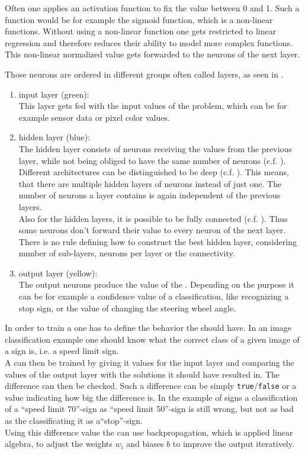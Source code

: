 Often one applies an activation function to fix the value between 0 and 1. Such a function would be for example the sigmoid function, which is a non-linear functions. Without using a non-linear function one gets restricted to linear regression and therefore reduces their ability to model more complex functions.
This non-linear normalized value gets forwarded to the neurons of the next layer.

Those neurons are ordered in different groups often called layers, as seen in .
\begin{enumerate}
	\item input layer (green):\\ \label{item input layer}
	This layer gets fed with the input values of the problem, which can be for example sensor data or pixel color values.
	\item hidden layer (blue):\\\label{item hidden layer}
	The hidden layer consists of neurons receiving the values from the previous layer, while not being obliged to have the same number of neurons (c.f. ).
	Different architectures can be distinguished to be deep (c.f. ). This means, that there are multiple hidden layers of neurons instead of just one. The number of neurons a layer contains is again independent of the previous layers.\\
	Also for the hidden layers, it is possible to be fully connected (c.f. ). Thus some neurons don't forward their value to every neuron of the next layer.\\
	There is no rule defining how to construct the best hidden layer, considering number of sub-layers, neurons per layer or the connectivity.
	\item output layer (yellow):\\ \label{item output layer}
	The output neurons produce the value of the \nn. Depending on the \nns purpose it can be for example a confidence value of a classification, like recognizing a stop sign, or the value of changing the steering wheel angle. 
\end{enumerate}

In order to train a \nn one has to define the behavior the \nn should have. In an image classification example one should know what the correct class of a given image of a sign is, i.e. a speed limit sign.\\
A \nn can then be trained by giving it values for the input layer and comparing the values of the output layer with the solutions it should have resulted in. The difference can then be checked. Such a difference can be simply \texttt{true}/\texttt{false} or a value indicating how big the difference is. In the example of signs a classification of a ``speed limit 70''-sign as ``speed limit 50''-sign is still wrong, but not as bad as  the classificating it as a``stop''-sign.\\
Using this difference value the \nn can use backpropagation, which is applied linear algebra, to adjust the weights $w_i$ and biases $b$ to improve the output iteratively.

